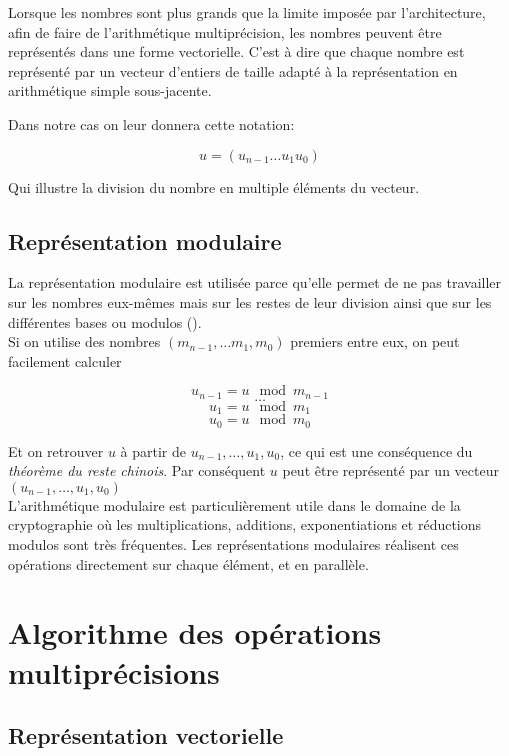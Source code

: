 \documentclass[letterpaper]{article}
\begin{document}
Lorsque les nombres sont plus grands que la limite imposée par l'architecture,
afin de faire de l'arithmétique multiprécision, les nombres peuvent être
représentés dans une forme vectorielle. C'est à dire que chaque nombre est
représenté par un vecteur d'entiers de taille adapté à la représentation
en arithmétique simple sous-jacente.

Dans notre cas on leur donnera cette notation:

  $$u = (u_{n-1} \dots u_1 u_0)$$

Qui illustre la division du nombre en multiple éléments du vecteur.


\subsection{Représentation modulaire}

La représentation modulaire est utilisée parce qu'elle permet de ne pas
travailler sur les nombres eux-mêmes mais sur les restes de leur division
ainsi que sur les différentes bases ou modulos (\cite{wikiamodulaire}).\\

Si on utilise des nombres $(m_{n - 1}, \dots m_1, m_0)$ premiers entre eux,
on peut facilement calculer

$$u_{n - 1} = u \mod m_{n - 1}$$
  $$\dots$$
  $$u_1 = u \mod m_1$$
  $$u_0 = u \mod m_0$$

  Et on retrouver $u$ à partir de $u_{n - 1}, \dots, u_1, u_0$, ce qui
est une conséquence du \emph{théorème du reste chinois}. Par conséquent $u$
peut être représenté par un vecteur $(u_{n - 1}, \dots, u_{1}, u_{0})$\\

L'arithmétique modulaire est particulièrement utile dans le domaine de la
cryptographie où les multiplications, additions, exponentiations et réductions
modulos sont très fréquentes. Les représentations modulaires réalisent ces
opérations directement sur chaque élément, et en parallèle.

\section{Algorithme des opérations multiprécisions}

\subsection{Représentation vectorielle}
\end{document}

